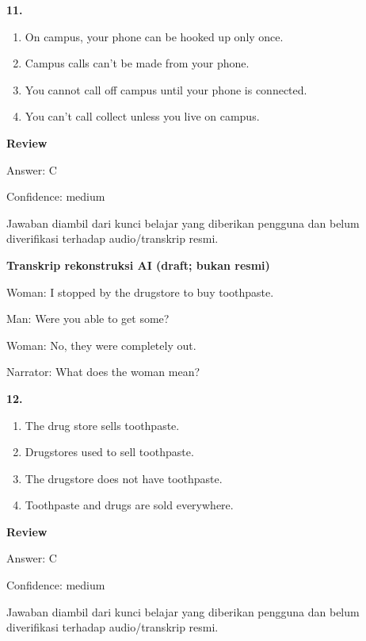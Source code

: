 \documentclass[12pt]{article}
\begin{document}
\noindent\textbf{11.}
\begin{enumerate}[label=(\Alph*),leftmargin=*,itemsep=0.2em]
\item On campus, your phone can be hooked up only once.
\item Campus calls can't be made from your phone.
\item You cannot call off campus until your phone is connected.
\item You can't call collect unless you live on campus.
\end{enumerate}
\par
\begingroup
\setlength{\parskip}{0pt}
\setlength{\parindent}{0pt}
\textbf{Review}\par
Answer: C\par
Confidence: medium\par
Jawaban diambil dari kunci belajar yang diberikan pengguna dan belum diverifikasi terhadap audio/transkrip resmi.\par
\endgroup
\par
\vspace{0.25\baselineskip}
\begin{exampleblock}
\textbf{Transkrip rekonstruksi AI (draft; bukan resmi)}\par
Woman: I stopped by the drugstore to buy toothpaste.\par
Man: Were you able to get some?\par
Woman: No, they were completely out.\par
Narrator: What does the woman mean?\par
\end{exampleblock}
\noindent\textbf{12.}
\begin{enumerate}[label=(\Alph*),leftmargin=*,itemsep=0.2em]
\item The drug store sells toothpaste.
\item Drugstores used to sell toothpaste.
\item The drugstore does not have toothpaste.
\item Toothpaste and drugs are sold everywhere.
\end{enumerate}
\par
\begingroup
\setlength{\parskip}{0pt}
\setlength{\parindent}{0pt}
\textbf{Review}\par
Answer: C\par
Confidence: medium\par
Jawaban diambil dari kunci belajar yang diberikan pengguna dan belum diverifikasi terhadap audio/transkrip resmi.\par
\end{document}
